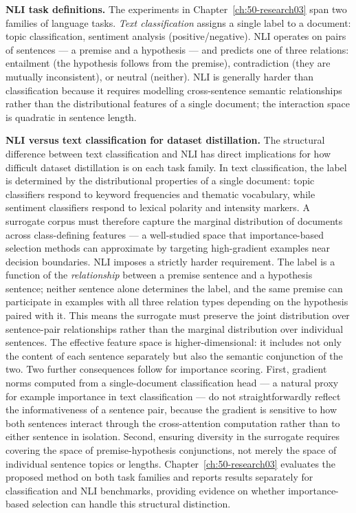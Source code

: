 \begin{foldable}
  \textbf{\ac{NLI} task definitions.}
  The experiments in Chapter~\ref{ch:50-research03} span two families of language tasks.
  \emph{Text classification} assigns a single label to a document: topic classification, sentiment analysis (positive/negative).
  \ac{NLI} operates on pairs of sentences --- a premise and a hypothesis --- and predicts one of three relations: entailment (the hypothesis follows from the premise), contradiction (they are mutually inconsistent), or neutral (neither).
  \ac{NLI} is generally harder than classification because it requires modelling cross-sentence semantic relationships rather than the distributional features of a single document; the interaction space is quadratic in sentence length.
\end{foldable}

\begin{foldable}
  \textbf{\ac{NLI} versus text classification for dataset distillation.}
  The structural difference between text classification and \ac{NLI} has direct implications for how difficult dataset distillation is on each task family.
  In text classification, the label is determined by the distributional properties of a single document: topic classifiers respond to keyword frequencies and thematic vocabulary, while sentiment classifiers respond to lexical polarity and intensity markers.
  A surrogate corpus must therefore capture the marginal distribution of documents across class-defining features --- a well-studied space that importance-based selection methods can approximate by targeting high-gradient examples near decision boundaries.
  \ac{NLI} imposes a strictly harder requirement.
  The label is a function of the \emph{relationship} between a premise sentence and a hypothesis sentence; neither sentence alone determines the label, and the same premise can participate in examples with all three relation types depending on the hypothesis paired with it.
  This means the surrogate must preserve the joint distribution over sentence-pair relationships rather than the marginal distribution over individual sentences.
  The effective feature space is higher-dimensional: it includes not only the content of each sentence separately but also the semantic conjunction of the two.
  Two further consequences follow for importance scoring.
  First, gradient norms computed from a single-document classification head --- a natural proxy for example importance in text classification --- do not straightforwardly reflect the informativeness of a sentence pair, because the gradient is sensitive to how both sentences interact through the cross-attention computation rather than to either sentence in isolation.
  Second, ensuring diversity in the surrogate requires covering the space of premise-hypothesis conjunctions, not merely the space of individual sentence topics or lengths.
  Chapter~\ref{ch:50-research03} evaluates the proposed method on both task families and reports results separately for classification and \ac{NLI} benchmarks, providing evidence on whether importance-based selection can handle this structural distinction.
\end{foldable}

